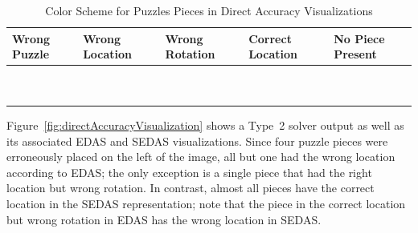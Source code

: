 \begin{table}[tb]
	\begin{center}
  		\begin{tabular}{ | >{\centering\arraybackslash}m{0.9in} | >{\centering\arraybackslash}m{0.9in} | >{\centering\arraybackslash}m{0.9in} | >{\centering\arraybackslash}m{0.9in} | >{\centering\arraybackslash}m{0.9in} | }
 \hline
    		Wrong Puzzle & Wrong Location & Wrong Rotation & Correct Location  & No Piece Present  \\ \hline
			{\cellcolor{blue}~} & {\cellcolor{red}~}  & {\cellcolor{orange}~}  & {\cellcolor{green}~} & {\cellcolor{black}~}  \\
			{\cellcolor{blue}~} & {\cellcolor{red}~}  & {\cellcolor{orange}~}  & {\cellcolor{green}~} & {\cellcolor{black}~} \\
 \hline
		\end{tabular}
	\end{center}
\caption{Color Scheme for Puzzles Pieces in Direct Accuracy Visualizations}\label{tab:directAccuracyColors}
\end{table}

Figure~\ref{fig:directAccuracyVisualization} shows a Type~2 solver output as well as its associated EDAS and SEDAS visualizations. Since four puzzle pieces were erroneously placed on the left of the image, all but one had the wrong location according to EDAS; the only exception is a single piece that had the right location but wrong rotation.  In contrast, almost all pieces have the correct location in the SEDAS representation; note that the piece in the correct location but wrong rotation in EDAS has the wrong location in SEDAS.

